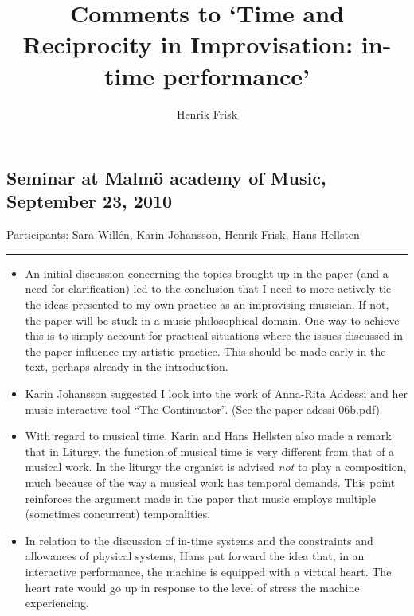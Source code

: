 \documentclass{article}
\begin{document}
\title{Comments to `Time and Reciprocity in Improvisation: in-time performance'}
\author{Henrik Frisk}
\date{}

\maketitle



\subsection*{Seminar at Malmö academy of Music, September 23, 2010}

Participants: Sara Willén, Karin Johansson, Henrik Frisk, Hans Hellsten

\vspace{.5cm}\hrule\vspace{.5cm}

\begin{itemize}
\item An initial discussion concerning the topics brought up in the paper (and a need for clarification) led to the conclusion that I need to more actively tie the ideas presented to my own practice as an improvising musician. If not, the paper will be stuck in a music-philosophical domain. One way to achieve this is to simply account for practical situations where the issues discussed in the paper influence my artistic practice. This should be made early in the text, perhaps already in the introduction.

\item Karin Johansson suggested I look into the work of Anna-Rita Addessi and her music interactive tool ``The Continuator''. (See the paper adessi-06b.pdf)

\item With regard to musical time, Karin and Hans Hellsten also made a remark that in Liturgy, the function of musical time is very different from that of a musical work. In the liturgy the organist is advised \emph{not} to play a composition, much because of the way a musical work has temporal demands. This point reinforces the argument made in the paper that music employs multiple (sometimes concurrent) temporalities.

\item In relation to the discussion of in-time systems and the constraints and allowances of physical systems, Hans put forward the idea that, in an interactive performance, the machine is equipped with a virtual heart. The heart rate would go up in response to the level of stress the machine experiencing.
\end{itemize}
\end{document}

